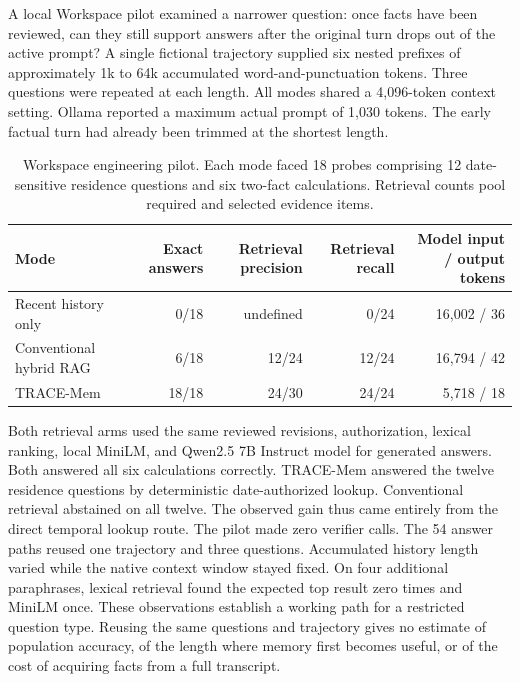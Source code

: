 \documentclass[11pt]{article}
\begin{document}
A local Workspace pilot examined a narrower question: once facts have been reviewed, can they still support answers after the original turn drops out of the active prompt? A single fictional trajectory supplied six nested prefixes of approximately 1k to 64k accumulated word-and-punctuation tokens. Three questions were repeated at each length. All modes shared a 4,096-token context setting. Ollama reported a maximum actual prompt of 1,030 tokens. The early factual turn had already been trimmed at the shortest length.

\begin{table}[htbp]\centering\small

\caption{Workspace engineering pilot. Each mode faced 18 probes comprising 12 date-sensitive residence questions and six two-fact calculations. Retrieval counts pool required and selected evidence items.}

\begin{tabularx}{\linewidth}{@{}Xrrrr@{}}\toprule
Mode & Exact answers & Retrieval precision & Retrieval recall & Model input / output tokens \\
\midrule
Recent history only & 0/18 & undefined & 0/24 & 16,002 / 36 \\
Conventional hybrid RAG & 6/18 & 12/24 & 12/24 & 16,794 / 42 \\
TRACE-Mem & 18/18 & 24/30 & 24/24 & 5,718 / 18 \\
\bottomrule\end{tabularx}

\end{table}

Both retrieval arms used the same reviewed revisions, authorization, lexical ranking, local MiniLM, and Qwen2.5 7B Instruct model for generated answers. Both answered all six calculations correctly. TRACE-Mem answered the twelve residence questions by deterministic date-authorized lookup. Conventional retrieval abstained on all twelve. The observed gain thus came entirely from the direct temporal lookup route. The pilot made zero verifier calls. The 54 answer paths reused one trajectory and three questions. Accumulated history length varied while the native context window stayed fixed. On four additional paraphrases, lexical retrieval found the expected top result zero times and MiniLM once. These observations establish a working path for a restricted question type. Reusing the same questions and trajectory gives no estimate of population accuracy, of the length where memory first becomes useful, or of the cost of acquiring facts from a full transcript.
\end{document}
